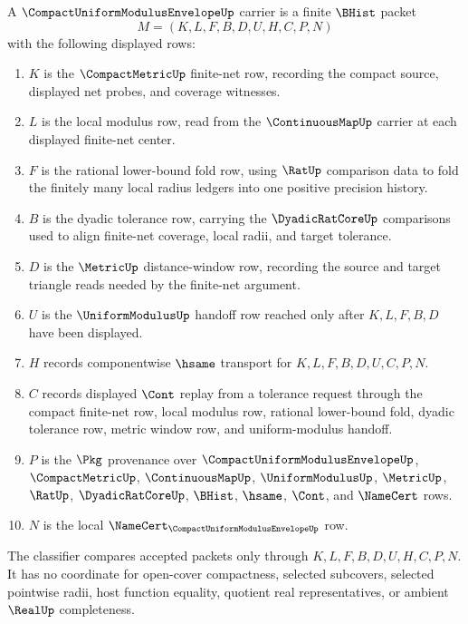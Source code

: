 \begin{definition}
\label{def:compact-uniform-modulus-envelope-carrier}
A $\CompactUniformModulusEnvelopeUp$ carrier is a finite $\BHist$ packet
$$
M=(K,L,F,B,D,U,H,C,P,N)
$$
with the following displayed rows:
\begin{enumerate}
\item $K$ is the $\CompactMetricUp$ finite-net row, recording the compact source, displayed net probes, and coverage witnesses.
\item $L$ is the local modulus row, read from the $\ContinuousMapUp$ carrier at each displayed finite-net center.
\item $F$ is the rational lower-bound fold row, using $\RatUp$ comparison data to fold the finitely many local radius ledgers into one positive precision history.
\item $B$ is the dyadic tolerance row, carrying the $\DyadicRatCoreUp$ comparisons used to align finite-net coverage, local radii, and target tolerance.
\item $D$ is the $\MetricUp$ distance-window row, recording the source and target triangle reads needed by the finite-net argument.
\item $U$ is the $\UniformModulusUp$ handoff row reached only after $K,L,F,B,D$ have been displayed.
\item $H$ records componentwise $\hsame$ transport for $K,L,F,B,D,U,C,P,N$.
\item $C$ records displayed $\Cont$ replay from a tolerance request through the compact finite-net row, local modulus row, rational lower-bound fold, dyadic tolerance row, metric window row, and uniform-modulus handoff.
\item $P$ is the $\Pkg$ provenance over $\CompactUniformModulusEnvelopeUp$, $\CompactMetricUp$, $\ContinuousMapUp$, $\UniformModulusUp$, $\MetricUp$, $\RatUp$, $\DyadicRatCoreUp$, $\BHist$, $\hsame$, $\Cont$, and $\NameCert$ rows.
\item $N$ is the local $\NameCert_{\CompactUniformModulusEnvelopeUp}$ row.
\end{enumerate}
The classifier compares accepted packets only through $K,L,F,B,D,U,H,C,P,N$. It has no coordinate for open-cover compactness, selected subcovers, selected pointwise radii, host function equality, quotient real representatives, or ambient $\RealUp$ completeness.
\end{definition}

